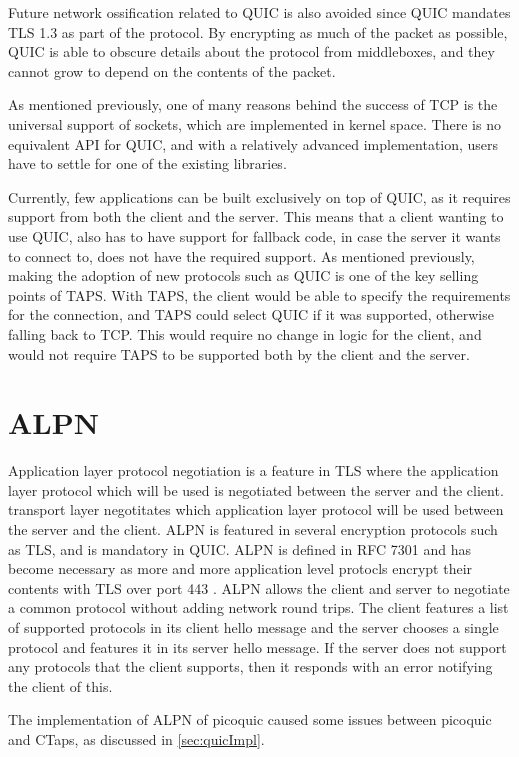Future network ossification related to QUIC is also avoided
since QUIC mandates TLS 1.3 as part of the protocol.
By encrypting as much of the packet as possible, QUIC is able to
obscure details about the protocol from middleboxes, and
they cannot grow to depend on the contents of the packet.

As mentioned previously, one of many reasons behind the success
of TCP is
the universal support of sockets, which are implemented in kernel space.
There is no equivalent API for QUIC, and with a relatively
advanced implementation, users have to settle for one of the
existing libraries.


Currently, few applications can be built exclusively on top of
QUIC, as it requires support from both the client and the
server. This means that a client wanting to use QUIC, also
has to have support for fallback code, in case the server
it wants to connect to, does not have the required support.
As mentioned previously, making the adoption of new protocols
such as QUIC is one of the key selling points of TAPS. With TAPS,
the client would be able to specify the requirements for the
connection, and TAPS could select QUIC if it was supported, otherwise
falling back to TCP. This would require no change in logic for
the client, and would not require TAPS to be supported both
by the client and the server.

\section{ALPN}
Application layer protocol negotiation is a feature in
TLS where the application layer protocol which will be
used is negotiated between the server and the client.
transport layer negotitates which application layer protocol
will be used between the server and the client. ALPN is featured
in several encryption protocols such as TLS, and is mandatory
in QUIC. ALPN is defined in RFC 7301 and has become necessary
as more and more application level protocls encrypt their
contents with TLS over port 443 \cite{friedlTransportLayerSecurity2014}.
ALPN allows the client and server to negotiate a common protocol
without adding network round trips. The client features
a list of supported protocols in its client hello message
and the server chooses a single protocol and features it in
its server hello message. If the server does not support any
protocols that the client supports, then it responds with an
error notifying the client of this.

The implementation of ALPN of picoquic caused some issues
between picoquic and CTaps, as discussed in \cref{sec:quicImpl}.

